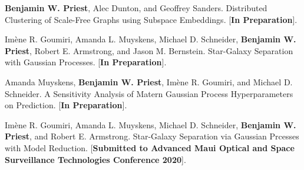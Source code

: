 \item \textbf{Benjamin W. Priest}, Alec Dunton, and Geoffrey Sanders.
	Distributed Clustering of Scale-Free Graphs using Subspace Embeddings. 
	[\textbf{In Preparation}].

\item Im\`ene R. Goumiri, Amanda L. Muyskens, Michael D. Schneider, \textbf{Benjamin W. Priest}, Robert E. Armstrong, and Jason M. Bernstein.
	Star-Galaxy Separation with Gaussian Processes.
	[\textbf{In Preparation}].

\item Amanda Muyskens, \textbf{Benjamin W. Priest}, Im\`ene R. Goumiri, and Michael D. Schneider.
	A Sensitivity Analysis of Matern Gaussian Process Hyperparameters on Prediction.
	[\textbf{In Preparation}].

\item Im\`ene R. Goumiri, Amanda L. Muyskens, Michael D. Schneider, \textbf{Benjamin W. Priest}, and Robert E. Armstrong.
	Star-Galaxy Separation via Gaussian Prcesses with Model Reduction.
	[\textbf{Submitted to Advanced Maui Optical and Space Surveillance Technologies Conference 2020}].
